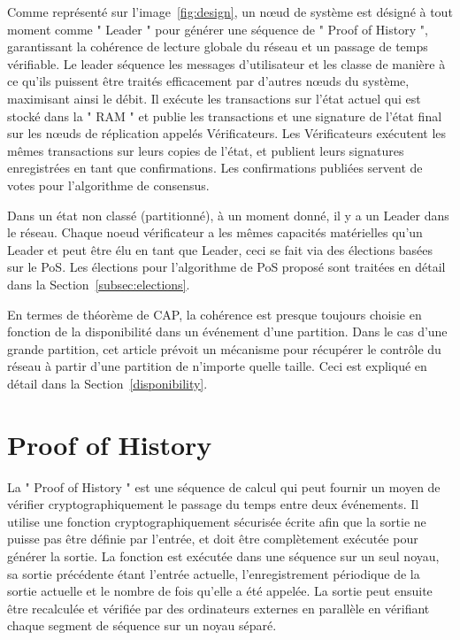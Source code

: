 \documentclass[12pt]{article}
\begin{document}
Comme représenté sur l’image~\ref{fig:design}, un nœud de système est désigné à tout moment comme " Leader " pour générer une séquence de " Proof of History ", garantissant la cohérence de lecture globale du réseau et un passage de temps vérifiable. Le leader séquence les messages d'utilisateur et les classe de manière à ce qu'ils puissent être traités efficacement par d'autres nœuds du système, maximisant ainsi le débit. Il exécute les transactions sur l'état actuel qui est stocké dans la " RAM " et publie les transactions et une signature de l'état final sur les nœuds de réplication appelés Vérificateurs. Les Vérificateurs exécutent les mêmes transactions sur leurs copies de l'état, et publient leurs signatures enregistrées en tant que confirmations. Les confirmations publiées servent de votes pour l'algorithme de consensus.

Dans un état non classé (partitionné), à un moment donné, il y a un Leader dans le réseau. Chaque noeud vérificateur a les mêmes capacités matérielles qu'un Leader et peut être élu en tant que Leader, ceci se fait via des élections basées sur le PoS. Les élections pour l'algorithme de PoS proposé sont traitées en détail dans la Section~\ref{subsec:elections}.

En termes de théorème de CAP, la cohérence est presque toujours choisie en fonction de la disponibilité dans un événement d'une partition. Dans le cas d'une grande partition, cet article prévoit un mécanisme pour récupérer le contrôle du réseau à partir d'une partition de n'importe quelle taille. Ceci est expliqué en détail dans la Section~\ref{disponibility}.

\section{Proof of History}\label{proof_of_history}

La " Proof of History " est une séquence de calcul qui peut fournir un moyen de vérifier cryptographiquement le passage du temps entre deux événements. Il utilise une fonction cryptographiquement sécurisée écrite afin que la sortie ne puisse pas être définie par l'entrée, et doit être complètement exécutée pour générer la sortie. La fonction est exécutée dans une séquence sur un seul noyau, sa sortie précédente étant l'entrée actuelle, l'enregistrement périodique de la sortie actuelle et le nombre de fois qu'elle a été appelée. La sortie peut ensuite être recalculée et vérifiée par des ordinateurs externes en parallèle en vérifiant chaque segment de séquence sur un noyau séparé.
\end{document}
